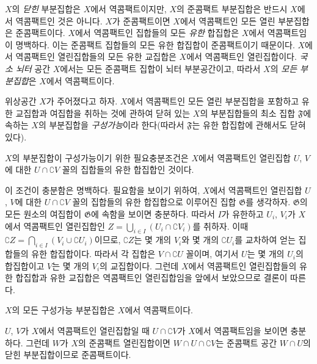 $X$의 \emph{닫힌} 부분집합은 $X$에서 역콤팩트이지만, $X$의 준콤팩트
부분집합은 반드시 $X$에서 역콤팩트인 것은 아니다. $X$가 준콤팩트이면
$X$에서 역콤팩트인 모든 열린 부분집합은 준콤팩트이다. $X$에서
역콤팩트인 집합들의 모든 \emph{유한} 합집합은 $X$에서 역콤팩트임이
명백하다. 이는 준콤팩트 집합들의 모든 유한 합집합이 준콤팩트이기
때문이다. $X$에서 역콤팩트인 열린집합들의 모든 유한 교집합은
$X$에서 역콤팩트인 열린집합이다. \emph{국소 뇌터} 공간 $X$에서는
모든 준콤팩트 집합이 뇌터 부분공간이고, 따라서 $X$의 \emph{모든
부분집합}은 $X$에서 역콤팩트이다.

\begin{definition}[9.1.2]
\label{0.9.1.2-ko}
위상공간 $X$가 주어졌다고 하자. $X$에서 역콤팩트인 모든 열린
부분집합을 포함하고 유한 교집합과 여집합을 취하는 것에 관하여 닫혀
있는 $X$의 부분집합들의 최소 집합 $\mathfrak{F}$에 속하는 $X$의
부분집합을 \emph{구성가능}이라 한다(따라서 $\mathfrak{F}$는 유한
합집합에 관해서도 닫혀 있다).
\end{definition}

\begin{proposition}[9.1.3]
\label{0.9.1.3-ko}
$X$의 부분집합이 구성가능이기 위한 필요충분조건은 $X$에서 역콤팩트인
열린집합 $U$, $V$에 대한 $U\cap\complement{V}$ 꼴의 집합들의 유한
합집합인 것이다.
\end{proposition}

이 조건이 충분함은 명백하다. 필요함을 보이기 위하여, $X$에서
역콤팩트인 열린집합 $U$, $V$에 대한 $U\cap\complement{V}$ 꼴의
집합들의 유한 합집합으로 이루어진 집합 $\mathfrak{G}$를 생각하자.
$\mathfrak{G}$의 모든 원소의 여집합이 $\mathfrak{G}$에 속함을 보이면
충분하다. 따라서 $I$가 유한하고 $U_i$, $V_i$가 $X$에서 역콤팩트인
열린집합인
$Z=\bigcup_{i\in I}(U_i\cap\complement{V_i})$를 취하자. 이때
$\complement{Z}=\bigcap_{i\in I}(V_i\cup\complement{U_i})$이므로,
$\complement{Z}$는 몇 개의 $V_i$와 몇 개의 $\complement{U_i}$를
교차하여 얻는 집합들의 유한 합집합이다. 따라서 각 집합은
$V\cap\complement{U}$ 꼴이며, 여기서 $U$는 몇 개의 $U_i$의
합집합이고 $V$는 몇 개의 $V_i$의 교집합이다. 그런데 $X$에서
역콤팩트인 열린집합들의 유한 합집합과 유한 교집합은 역콤팩트인
열린집합임을 앞에서 보았으므로 결론이 따른다.

\begin{corollary}[9.1.4]
\label{0.9.1.4-ko}
$X$의 모든 구성가능 부분집합은 $X$에서 역콤팩트이다.
\end{corollary}

$U$, $V$가 $X$에서 역콤팩트인 열린집합일 때
$U\cap\complement{V}$가 $X$에서 역콤팩트임을 보이면 충분하다.
그런데 $W$가 $X$의 준콤팩트 열린집합이면
$W\cap U\cap\complement{V}$는 준콤팩트 공간 $W\cap U$의 닫힌
부분집합이므로 준콤팩트이다.

